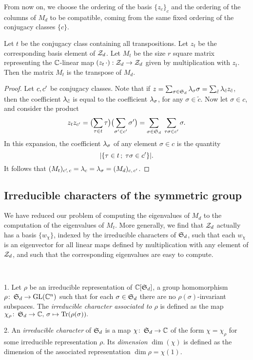 From now on, we choose the ordering of the basis $\{z_c\}_c$ and the ordering of the columns of $M_d$ to be compatible, \ie coming from the same fixed ordering of the conjugacy classes $\{c\}$.

\begin{prop} \label{prop:transpose-correspondence}
 Let $t$ be the conjugacy class containing all transpositions. Let $z_t$ be the corresponding basis element of $\mathcal{Z}_d$. Let $M_t$ be the size $r$ square matrix representing the $\mathbb{C}$-linear map $(z_t\,\cdot):\mathcal{Z}_d\to\mathcal{Z}_d$ given by multiplication with $z_t$. Then the matrix $M_t$ is the transpose of $M_d$.
\end{prop}
\begin{proof}
 Let $c,c'$ be conjugacy classes. Note that if $z=\sum_{\sigma\in\operatorname{\mathfrak{S}}_d}\lambda_\sigma \sigma=\sum_{\tilde c}\lambda_{\tilde c} z_{\tilde c}$, then the coefficient $\lambda_{\tilde c}$ is equal to the coefficient $\lambda_{\sigma}$, for any $\sigma\in \tilde c$. Now let $\sigma\in c$, and consider the product
 \[
  z_tz_{c'}=\bigl(\sum_{\tau\in t}\tau\bigr)\bigl(\sum_{\sigma'\in c'}\sigma'\bigr)=\sum_{\sigma\in\operatorname{\mathfrak{S}}_d}\;\sum_{\tau\sigma\in c'}\sigma.
 \]
 In this expansion, the coefficient $\lambda_{\sigma}$ of any element $\sigma\in c$ is the quantity \[|\{\tau\in t\,;\; \tau\sigma\in c'\}|.\] It follows that $(M_t)_{c'\!,\, c}=\lambda_c=\lambda_{\sigma}=(M_d)_{c,\, c'}$.
\end{proof}

\subsection{Irreducible characters of the symmetric group}

We have reduced our problem of computing the eigenvalues of $M_d$ to the computation of the eigenvalues of $M_t$. More generally, we find that $\mathcal{Z}_d$ actually has a basis $\{w_\chi\}$, indexed by the irreducible characters of $\operatorname{\mathfrak{S}}_d$, such that each $w_\chi$ is an eigenvector for all linear maps defined by multiplication with any element of $\mathcal{Z}_d$, and such that the corresponding eigenvalues are easy to compute.

\begin{defi} \ 

  1. Let $\rho$ be an irreducible representation of $\mathbb{C}[\operatorname{\mathfrak{S}}_d]$, \ie a group homomorphism $\rho\colon \operatorname{\mathfrak{S}}_d\to \operatorname{GL}(\mathbb{C}^n)$ such that for each $\sigma\in\operatorname{\mathfrak{S}}_d$ there are no $\rho(\sigma)$-invariant subspaces. The \emph{irreducible character associated to $\rho$} is defined as the map $\chi_\rho\colon \operatorname{\mathfrak{S}}_d\to\mathbb{C},\, \sigma\mapsto\operatorname{Tr}(\rho(\sigma)).$
  
  2. An \emph{irreducible character} of $\operatorname{\mathfrak{S}}_d$ is a map $\chi\colon \operatorname{\mathfrak{S}}_d\to\mathbb{C}$ of the form $\chi=\chi_\rho$ for some irreducible representation $\rho$. Its \emph{dimension} $\dim(\chi)$ is defined as the dimension of the associated representation $\dim\rho=\chi(1)$.
\end{defi}

